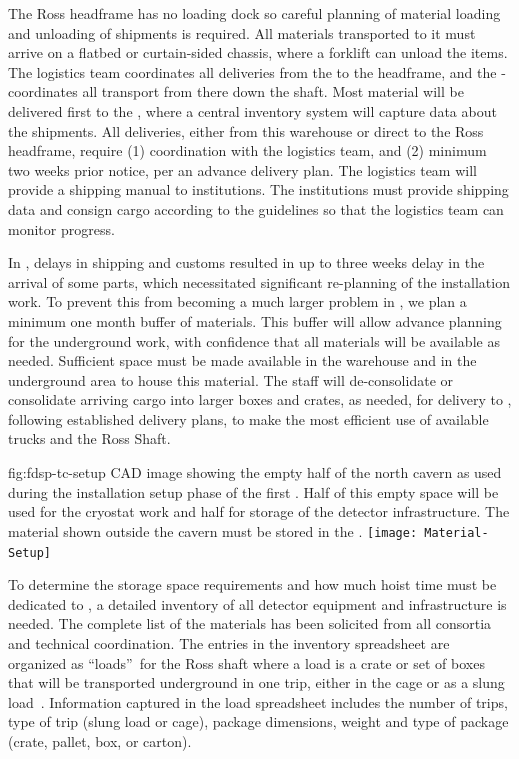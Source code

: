 The Ross headframe has no loading dock so careful planning of material loading and unloading of shipments is required. 
All materials transported to it must arrive on a flatbed or curtain-sided chassis, where a forklift can unload  the items. 
The logistics team coordinates all deliveries from the  to the headframe, and the - coordinates all transport from there down the shaft.  
Most material will be delivered first to the , where a central inventory system will capture data about the shipments.  
All deliveries, either from this warehouse or direct to the Ross headframe, require (1) coordination with the logistics team, and (2) minimum two weeks prior notice, per an advance delivery plan.  
The logistics team will provide a shipping manual  to  institutions. 
The institutions must provide shipping data and consign cargo according to the guidelines so that the logistics team can monitor progress. 


In , delays in shipping and customs resulted in up to three weeks delay in the arrival of some parts, which necessitated significant re-planning of the installation work. 
To prevent this from becoming a much larger problem in , we plan a minimum one month buffer of materials. 
This buffer will allow advance planning for the underground work, with confidence that all materials will be available as needed. 
Sufficient space must be made available in the warehouse and in the underground area  to house this material.
The  staff will de-consolidate or consolidate arriving cargo into larger boxes and crates, as needed, for  delivery to , following established delivery plans, to make the most efficient use of available trucks and the Ross Shaft. 

\begin{dunefigure}{fig:fdsp-tc-setup}
  {CAD image showing the empty half of the north cavern as used during the installation setup phase of the first .  Half of this empty space will be used for the cryostat work and half for storage of the detector infrastructure. The material shown outside the cavern must be stored in the .}
\texttt{[image: Material-Setup]}
\end{dunefigure}


To determine the  storage space requirements and how much hoist time must be dedicated to , a detailed inventory of all detector equipment and  infrastructure is needed. 
The complete list of the materials has been solicited from all consortia and technical coordination. 
The entries in the inventory spreadsheet are organized as \textquotedblleft loads\textquotedblright \ for the Ross shaft where a load is a crate or set of boxes that will be transported underground in one trip, either in the cage or as a slung load~\cite{bib:docdb8426}. 
Information captured in the load spreadsheet includes the number of  
trips, type of trip (slung load or cage), package dimensions, weight and type of package (crate, pallet, box, or carton). 

